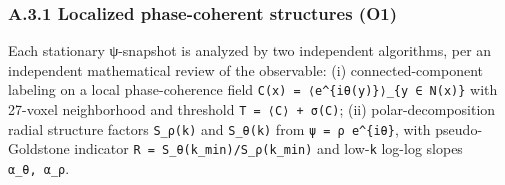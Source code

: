 \documentclass[
]{article}
\begin{document}
\hypertarget{a.3.1-localized-phase-coherent-structures-o1}{%
\subsubsection{A.3.1 Localized phase-coherent structures
(O1)}\label{a.3.1-localized-phase-coherent-structures-o1}}

Each stationary ψ-snapshot is analyzed by two independent algorithms,
per an independent mathematical review of the observable: (i)
connected-component labeling on a local phase-coherence field
\texttt{C(x)\ =\ \textbar{}⟨e\^{}\{iθ(y)\}⟩\_\{y\ ∈\ N(x)\}\textbar{}}
with 27-voxel neighborhood and threshold \texttt{T\ =\ ⟨C⟩\ +\ σ(C)};
(ii) polar-decomposition radial structure factors
\texttt{S\_ρ(\textbar{}k\textbar{})} and
\texttt{S\_θ(\textbar{}k\textbar{})} from \texttt{ψ\ =\ ρ\ e\^{}\{iθ\}},
with pseudo-Goldstone indicator \texttt{R\ =\ S\_θ(k\_min)/S\_ρ(k\_min)}
and low-\texttt{k} log-log slopes \texttt{α\_θ,\ α\_ρ}.
\end{document}

